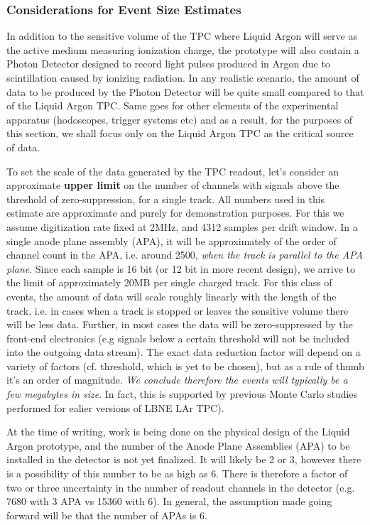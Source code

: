 \subsubsection{Considerations for Event Size Estimates}
In addition to the sensitive volume of the TPC where Liquid Argon will serve as the active medium measuring ionization charge,
the prototype will also contain a Photon Detector designed
to record light pulses produced in Argon due to scintillation caused by ionizing radiation. In any realistic scenario, the amount of data to be produced by
the Photon Detector will be quite small compared to that of the Liquid Argon TPC. Same goes for other elements of the experimental apparatus (hodoscopes,
trigger systems etc) and as a result, for the purposes of this section, we shall focus only on the Liquid Argon TPC as the critical source of data.

To set the scale of the data generated by the TPC readout, let's consider an approximate \textbf{upper limit} on the number of channels with
signals above the threshold of zero-suppression, for a single track. All numbers used in this estimate
are approximate and purely for demonstration purposes. For this we assume digitization rate fixed at 2MHz,
and 4312 samples per drift window. In a single anode plane assembly (APA), it will be approximately of the order of
channel count in the APA, i.e. around 2500, \textit{when the track is parallel to the APA plane}.
Since each sample is 16 bit (or 12 bit in more recent design), we arrive to the limit of approximately 20MB per single charged track.
For this class of events, the amount of data will scale roughly linearly with the length of the track, i.e. in cases when a track is
stopped or leaves the sensitive volume there will be less data. Further, in most cases the data will be zero-suppressed by the front-end
electronics (e.g signals below a certain threshold
will not be included into the outgoing data stream). The exact data reduction factor will depend on a variety of factors
(cf. threshold, which is yet to be chosen), but as a rule of
thumb it's an order of magnitude. \textit{We conclude therefore the events will typically be a few megabytes in size}. In fact, this is supported
by previous Monte Carlo studies performed for ealier versions of LBNE LAr TPC).

At the time of writing, work is being done on the physical design of the Liquid Argon prototype, and the number of the Anode Plane Assemblies (APA)
to be installed in the detector is not yet finalized. It will likely be 2 or 3, however there is a possibility of this number to be as high as 6.  There is therefore a
factor of two or three  uncertainty in the number of readout channels in the detector (e.g. 7680 with 3 APA vs 15360 with 6). In general, the assumption made
going forward will be that the number of APAs is 6.

